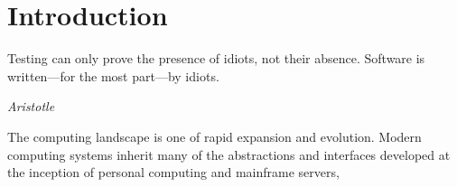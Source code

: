 \chapter{Introduction}
\epigraph{Testing can only prove the presence of idiots, not their absence. Software is written---for the most part---by idiots.}%
         {\textit{Aristotle}}


The computing landscape is one of rapid expansion and evolution.
Modern computing systems inherit many of the abstractions and interfaces
developed at the inception of personal computing and mainframe servers,

